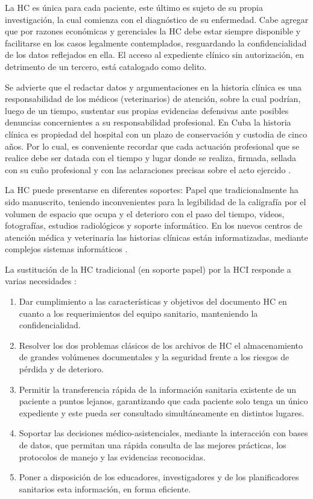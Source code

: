 La HC es única para cada paciente, este último es sujeto de su propia investigación, la cual comienza con el diagnóstico de su enfermedad. Cabe agregar que por razones económicas y gerenciales la HC debe estar siempre disponible y facilitarse en los casos legalmente contemplados, resguardando la confidencialidad de los datos reflejados en ella. El acceso al expediente clínico sin autorización, en detrimento de un tercero, está catalogado como delito.

Se advierte que el redactar datos y argumentaciones en la historia clínica es una responsabilidad de los médicos (veterinarios) de atención, sobre la cual podrían, luego de un tiempo, sustentar sus propias evidencias defensivas ante posibles denuncias concernientes a su responsabilidad profesional. En Cuba la historia clínica es propiedad del hospital con un plazo de conservación y custodia de cinco años. Por lo cual, es conveniente recordar que cada actuación profesional que se realice debe ser datada con el tiempo y lugar donde se realiza, firmada, sellada con su cuño profesional y con las aclaraciones precisas sobre el acto ejercido   .

La HC puede presentarse en diferentes soportes: Papel que tradicionalmente ha sido manuscrito, teniendo inconvenientes para la legibilidad de la caligrafía por el volumen de espacio que ocupa y el deterioro con el paso del tiempo, videos, fotografías, estudios radiológicos y soporte informático. En los nuevos centros de atención médica y veterinaria las historias clínicas están informatizadas, mediante complejos sistemas informáticos .

La sustitución de la HC tradicional (en soporte papel) por la HCI responde a varias necesidades :  

\begin{enumerate}
	\item Dar cumplimiento a las características y objetivos del documento HC en cuanto a los requerimientos del equipo sanitario, manteniendo la confidencialidad.  
	
	\item Resolver los dos problemas clásicos de los archivos de HC el almacenamiento de grandes volúmenes documentales y la seguridad frente a los riesgos de pérdida y de deterioro.  
	
	\item Permitir la transferencia rápida de la información sanitaria existente de un paciente a puntos lejanos, garantizando que cada paciente solo tenga un único expediente y este pueda ser consultado simultáneamente en distintos lugares.  
	
	\item Soportar las decisiones médico-asistenciales, mediante la interacción con bases de datos, que permitan una rápida consulta de las mejores prácticas, los protocolos de manejo y las evidencias reconocidas.  
	
	\item Poner a disposición de los educadores, investigadores y de los planificadores sanitarios esta información, en forma eficiente. 
\end{enumerate}

